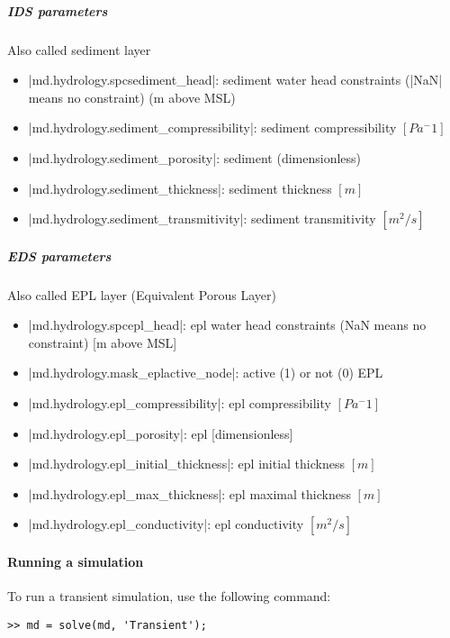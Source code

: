 \subparagraph{IDS parameters}
Also called sediment layer

\begin{itemize}
	\item \lstinlinebg|md.hydrology.spcsediment_head|: sediment water head constraints (\lstinlinebg|NaN| means no constraint) (m above MSL)
	\item \lstinlinebg|md.hydrology.sediment_compressibility|: sediment compressibility $[Pa^-1]$
	\item \lstinlinebg|md.hydrology.sediment_porosity|: sediment (dimensionless)
	\item \lstinlinebg|md.hydrology.sediment_thickness|: sediment thickness $[m]$
	\item \lstinlinebg|md.hydrology.sediment_transmitivity|: sediment transmitivity $[m^2/s]$
\end{itemize}

\subparagraph{EDS parameters}
Also called EPL layer (Equivalent Porous Layer)

\begin{itemize}
	\item \lstinlinebg|md.hydrology.spcepl_head|: epl water head constraints (NaN means no constraint) [m above MSL]
	\item \lstinlinebg|md.hydrology.mask_eplactive_node|: active (1) or not (0) EPL
	\item \lstinlinebg|md.hydrology.epl_compressibility|: epl compressibility $[Pa^-1]$
	\item \lstinlinebg|md.hydrology.epl_porosity|: epl [dimensionless]
	\item \lstinlinebg|md.hydrology.epl_initial_thickness|: epl initial thickness $[m]$
	\item \lstinlinebg|md.hydrology.epl_max_thickness|: epl maximal thickness $[m]$
	\item \lstinlinebg|md.hydrology.epl_conductivity|: epl conductivity $[m^2/s]$
\end{itemize}

\paragraph{Running a simulation}
To run a transient simulation, use the following command:
\begin{lstlisting}
>> md = solve(md, 'Transient');
\end{lstlisting}

